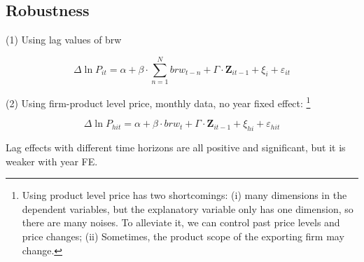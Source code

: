 \documentclass[12pt]{article}
\begin{document}
\subsection{Robustness}

(1) Using lag values of brw

\begin{equation}
    \Delta \ln P_{it} = \alpha + \beta \cdot \sum^{N}_{n=1}  brw_{t-n}+ \Gamma \cdot \textbf{Z}_{it-1}+\xi_{i}+\varepsilon_{i t}
\end{equation}

(2) Using firm-product level price, monthly data, no year fixed effect: \footnote{Using product level price has two shortcomings: (i) many dimensions in the dependent variables, but the explanatory variable only has one dimension, so there are many noises. To alleviate it, we can control past price levels and price changes; (ii) Sometimes, the product scope of the exporting firm may change.}



\begin{equation}
    \Delta \ln P_{hit} = \alpha+\beta \cdot brw_{t}+ \Gamma \cdot \textbf{Z}_{it-1}+\xi_{hi}+\varepsilon_{hi t}
\end{equation}

Lag effects with different time horizons are all positive and significant, but it is weaker with year FE.
\end{document}
